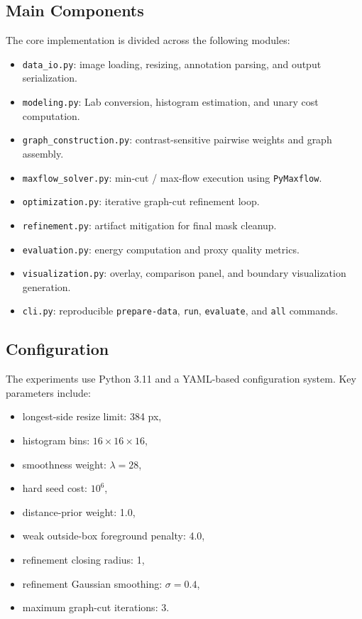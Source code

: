 \documentclass[conference]{IEEEtran}
\begin{document}
\subsection{Main Components}
The core implementation is divided across the following modules:
\begin{itemize}
  \item \texttt{data\_io.py}: image loading, resizing, annotation parsing, and output serialization.
  \item \texttt{modeling.py}: Lab conversion, histogram estimation, and unary cost computation.
  \item \texttt{graph\_construction.py}: contrast-sensitive pairwise weights and graph assembly.
  \item \texttt{maxflow\_solver.py}: min-cut / max-flow execution using \texttt{PyMaxflow}.
  \item \texttt{optimization.py}: iterative graph-cut refinement loop.
  \item \texttt{refinement.py}: artifact mitigation for final mask cleanup.
  \item \texttt{evaluation.py}: energy computation and proxy quality metrics.
  \item \texttt{visualization.py}: overlay, comparison panel, and boundary visualization generation.
  \item \texttt{cli.py}: reproducible \texttt{prepare-data}, \texttt{run}, \texttt{evaluate}, and \texttt{all} commands.
\end{itemize}

\subsection{Configuration}
The experiments use Python 3.11 and a YAML-based configuration system. Key parameters include:
\begin{itemize}
  \item longest-side resize limit: 384 px,
  \item histogram bins: \(16 \times 16 \times 16\),
  \item smoothness weight: \(\lambda = 28\),
  \item hard seed cost: \(10^6\),
  \item distance-prior weight: 1.0,
  \item weak outside-box foreground penalty: 4.0,
  \item refinement closing radius: 1,
  \item refinement Gaussian smoothing: \(\sigma = 0.4\),
  \item maximum graph-cut iterations: 3.
\end{itemize}
\end{document}
